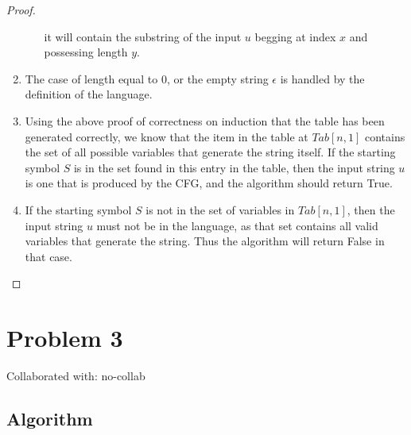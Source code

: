 \documentclass{article}
\begin{document}
\begin{proof}
\begin{enumerate}
\begin{enumerate}
                              it will contain the substring of the input $u$ begging at index
                              $x$ and possessing length $y$.
                  \end{enumerate}
            \item The case of length equal to 0, or the empty string $\epsilon$ is handled by
                  the definition of the language.
            \item Using the above proof of correctness on induction that the table has
                  been generated correctly, we know that the item in the table at $Tab[n,1]$
                  contains the set of all possible variables that generate the string itself.
                  If the starting symbol $S$ is in the set found in this entry in the table,
                  then the input string $u$ is one that is produced by the CFG, and the
                  algorithm should return True.
            \item If the starting symbol $S$ is not in the set of variables in $Tab[n,1]$,
                  then the input string $u$ must not be in the language, as that set contains all
                  valid variables that generate the string. Thus the algorithm will return
                  False in that case.
      \end{enumerate}

\end{proof}

\newpage
\section{Problem 3}
Collaborated with: no-collab

\subsection{Algorithm}
\end{document}
